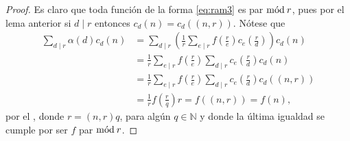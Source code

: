 \begin{proof}
Es claro que toda función de la forma \eqref{eq:ram3} es par $\mathrm{m\acute{o}d\:}r$, pues por el lema anterior si $d \mid r$ entonces $c_d(n)=c_d((n,r))$. Nótese que
\begin{equation*}
\begin{split}
    \sum_{d \mid r} \alpha(d) c_d(n) &= \sum_{d \mid r} \left( \frac{1}{r} \sum_{e \mid r} f \left( \frac{r}{e} \right) c_e \left( \frac{r}{d} \right) \right) c_d(n) \\
                                     &= \frac{1}{r} \sum_{e \mid r} f \left( \frac{r}{e} \right) \sum_{d \mid r} c_e \left( \frac{r}{d} \right) c_d(n) \\
                                     &= \frac{1}{r} \sum_{e \mid r} f \left( \frac{r}{e} \right) \sum_{d \mid r} c_e \left( \frac{r}{d} \right) c_d((n,r)) \\
                                     &= \frac{1}{r} f \left( \frac{r}{q} \right) r = f((n,r)) = f(n),
\end{split}
\end{equation*}
por el , donde $r=(n,r) q$, para algún $q \in \mathbb{N}$ y donde la última igualdad se cumple por ser $f$ par $\mathrm{m\acute{o}d\:}r$.
\bigskip


\end{proof}
